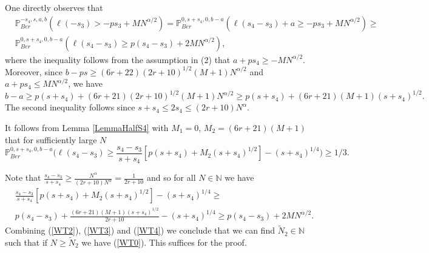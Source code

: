 One directly observes that
\begin{equation}\label{WT2}
	\begin{split}
		&\mathbb{P}^{-s_4,s,a,b}_{Ber}\left( \ell(-s_3) > -ps_3 + MN^{\alpha/2}\right) = \mathbb{P}^{0,s+s_4,0,b-a}_{Ber}\left(\ell(s_4-s_3) + a \geq -ps_3 + MN^{\alpha/2}\right) \geq\\
		& \mathbb{P}^{0,s+s_4,0,b-a}_{Ber}\left(\ell(s_4-s_3) \geq p(s_4-s_3) + 2MN^{\alpha/2}\right),
	\end{split}
\end{equation}
where the inequality follows from the assumption in (2) that $a+ps_4 \geq -MN^{\alpha/2}$. Moreover, since $b-ps \geq (6r+22)(2r+10)^{1/2}(M+1)N^{\alpha/2}$ and $a+ps_4 \leq MN^{\alpha/2}$, we have 
$$b-a \geq p(s+s_4) + (6r+21)(2r+10)^{1/2}(M+1)N^{\alpha/2} \geq p(s+s_4) + (6r+21)(M+1)(s+s_4)^{1/2}.$$
The second inequality follows since $s+s_4 \leq 2s_4 \leq (2r+10)N^{\alpha}$. 

It follows from Lemma \ref{LemmaHalfS4} with $M_1 = 0$, $M_2 = (6r+21)(M+1)$ that for sufficiently large $N$
\begin{equation}\label{WT3}
	\mathbb{P}^{0,s+s_4,0,b-a}_{Ber}\Big(\ell(s_4-s_3) \geq \frac{s_4-s_3}{s+s_4}[p(s+s_4) + M_2 (s+s_4)^{1/2}] - (s+s_4)^{1/4}\Big) \geq 1/3.
\end{equation}

Note that $\frac{s_4-s_3}{s+s_4} \geq \frac{N^\alpha }{(2r+10)N^\alpha} = \frac{1}{2r+10}$ and so for all $N \in \mathbb{N}$ we have
\begin{equation}\label{WT4}
	\begin{split}
		& \frac{s_4-s_3}{s+s_4}[p(s+s_4) + M_2 (s+s_4)^{1/2}] - (s+s_4)^{1/4} \geq \\
		& p(s_4-s_3) + \frac{(6r+21)(M+1) (s+s_4)^{1/2}}{2r+10}  - (s+s_4)^{1/4} \geq p(s_4-s_3) + 2MN^{\alpha/2}.
	\end{split}
\end{equation}
Combining (\ref{WT2}), (\ref{WT3}) and (\ref{WT4}) we conclude that we can find $\tilde{N}_2 \in \mathbb{N}$ such that if $N \geq \tilde{N}_2$ we have (\ref{WT0}). This suffices for the proof.


%
